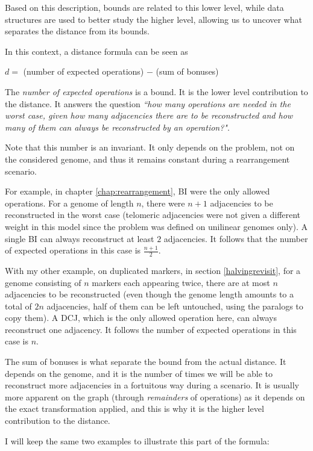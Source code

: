\documentclass[11pt,final,twoside,nofrench]{thlifl}
\begin{document}
Based on this description, bounds are related to this  lower level, while data structures are used to better study the higher level, allowing us to uncover what separates the distance from its bounds.

In this context, a distance formula can be seen as 

\begin{center}
$d =$ (number of expected operations) $-$ (sum of bonuses)
\end{center}

The \emph{number of expected operations} is a bound. It is the lower level contribution to the distance. It answers the question \emph{``how many operations are needed in the worst case, given how many adjacencies there are to be reconstructed and how many of them can always be reconstructed by an operation?"}.

Note that this number is an invariant. It only depends on the problem, not on the considered genome, and thus it remains constant during a rearrangement scenario.

For example, in chapter \ref{chap:rearrangement}, BI were the only allowed operations. For a genome of length $n$, there were $n+1$ adjacencies to be reconstructed in the worst case (telomeric adjacencies were not given a different weight in this model since the problem was defined on unilinear genomes only). A single BI can always reconstruct at least $2$ adjacencies. It follows that the number of expected operations in this case is $\frac{n+1}{2}$.

With my other example, on duplicated markers, in section \ref{halvingrevisit}, for a genome consisting of $n$ markers each appearing twice, there are at most $n$ adjacencies to be reconstructed (even though the genome length amounts to a total of $2n$ adjacencies, half of them can be left untouched, using the paralogs to copy them). A DCJ, which is the only allowed operation here, can always reconstruct one adjacency. It follows the number of expected operations in this case is $n$.

The sum of bonuses is what separate the bound from the actual distance. It depends on the genome, and it is the number of times we will be able to reconstruct more adjacencies in a fortuitous way during a scenario. It is usually more apparent on the graph (through \emph{remainders} of operations) as it depends on the exact transformation applied, and this is why it is the higher level contribution to the distance.

I will keep the same two examples to illustrate this part of the formula:
\end{document}
